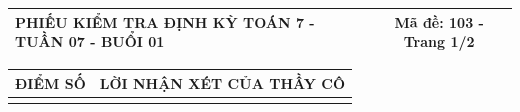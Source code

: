 \documentclass[12pt,a4paper]{article}
\begin{document}
\newpage


\noindent
\begin{tabularx}{\linewidth}{|X|c|}
\hline
\textbf{PHIẾU KIỂM TRA ĐỊNH KỲ TOÁN 7 - TUẦN 07 - BUỔI 01} & \textbf{Mã đề: 103 - Trang 1/2} \\
\hline
\end{tabularx}

\vspace{1.2mm}

\noindent
\begin{tabularx}{\linewidth}{|p{3.2cm}|X|}
\hline
\centering\textbf{ĐIỂM SỐ} & \centering\textbf{LỜI NHẬN XÉT CỦA THẦY CÔ} \tabularnewline
\hline
\rule{0pt}{1.8cm} & \tabularnewline
\hline
\end{tabularx}

\vspace{1.5mm}
\end{document}
